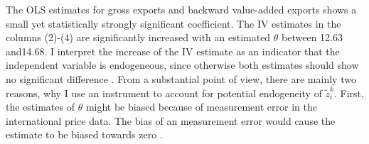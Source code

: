 \par 
The OLS estimates for gross exports and backward value-added exports shows a small yet statistically strongly significant coefficient. The IV estimates in the columns (2)-(4) are significantly increased with an estimated $\theta$ between 12.63 and14.68. I interpret the increase of the IV estimate as an indicator that the independent variable is endogeneous, since otherwise both estimates should show no significant difference \textcite{hausman1978}. 
From a substantial point of view, there are mainly two reasons, why I use an instrument to account for potential endogeneity of $\tilde{z}^k_i $. First, the estimates of $\theta$ might be biased because of measurement error in the international price data.  The bias of an measurement error would cause the estimate to be biased towards zero \parencite{Angrist-Krueger01}. 
